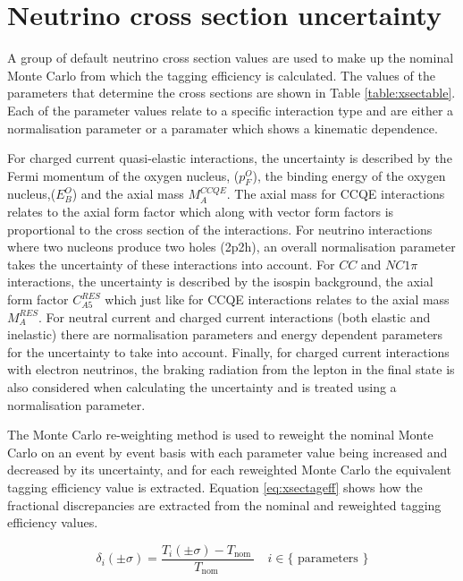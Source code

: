 \section{Neutrino cross section uncertainty}

A group of default neutrino cross section values are used to make up the nominal Monte Carlo from which the tagging efficiency is calculated. The values of the parameters that determine the cross sections are shown in Table \ref{table:xsectable}. Each of the parameter values relate to a specific interaction type and are either a normalisation parameter or a paramater which shows a kinematic dependence. \newline

For charged current quasi-elastic interactions, the uncertainty is described by the Fermi momentum of the oxygen nucleus, ($p_{F}^{O}$), the binding energy of the oxygen nucleus,($E_{B}^{O}$) and the axial mass $M_{A}^{C C Q E}$. The axial mass for CCQE interactions relates to the axial form factor which along with vector form factors is proportional to the cross section of the interactions. For neutrino interactions where two nucleons produce two holes (2p2h), an overall normalisation parameter takes the uncertainty of these interactions into account. For $CC$ and $NC1\pi$ interactions, the uncertainty is described by the isospin background, the axial form factor $C_{A 5}^{R E S}$ which just like for CCQE interactions relates to the axial mass $M_{A}^{R E S}$. For neutral current and charged current interactions (both elastic and inelastic) there are normalisation parameters and energy dependent parameters for the uncertainty to take into account. Finally, for charged current interactions with electron neutrinos, the braking radiation from the lepton in the final state is also considered when calculating the uncertainty and is treated using a normalisation parameter.
\newline

The Monte Carlo re-weighting method is used to reweight the nominal Monte Carlo on an event by event basis with each parameter value being increased and decreased by its uncertainty, and for each reweighted Monte Carlo the equivalent tagging efficiency value is extracted. Equation \ref{eq:xsectageff} shows how the fractional discrepancies are extracted from the nominal and reweighted tagging efficiency values.

\begin{equation}
\delta_{i}(\pm \sigma)=\frac{T_{i}(\pm \sigma)-T_{\text {nom }}}{T_{\text {nom }}} \quad i \in\{\text { parameters }\}
\label{eq:xsectageff}
\end{equation}


